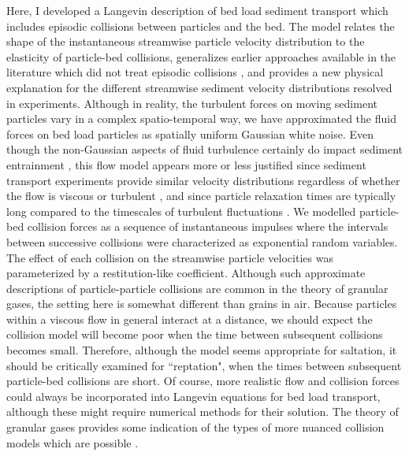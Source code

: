 Here, I developed a Langevin description of bed load sediment transport which includes episodic collisions between particles and the bed.
The model relates the shape of the instantaneous streamwise particle velocity distribution to the elasticity of particle-bed collisions,
generalizes earlier approaches available in the literature which did not treat episodic collisions \citep{Ancey2014,Fan2014}, and provides a new physical explanation for the different streamwise sediment velocity distributions resolved in experiments.
Although in reality, the turbulent forces on moving sediment particles vary in a complex spatio-temporal way, we have approximated the fluid forces on bed load particles as spatially uniform Gaussian white noise. Even though the non-Gaussian aspects of fluid turbulence certainly do impact sediment entrainment \citep{Cameron2020,Celik2014}, this flow model appears more or less justified since sediment transport experiments provide similar velocity distributions regardless of whether the flow is viscous or turbulent \citep{Lajeunesse2010, Charru2004}, and since particle relaxation times are typically long compared to the timescales of turbulent fluctuations \citep{Hofland2006,Schmeeckle2007,Nakagawa1981}.
We modelled particle-bed collision forces as a sequence of instantaneous impulses where the intervals between successive collisions were characterized as exponential random variables. The effect of each collision on the streamwise particle velocities was parameterized by a restitution-like coefficient.
Although such approximate descriptions of particle-particle collisions are common in the theory of granular gases, the setting here is somewhat different than grains in air. Because particles within a viscous flow in general interact at a distance, we should expect the collision model will become poor when the time between subsequent collisions becomes small. Therefore, although the model seems appropriate for saltation, it should be critically examined for ``reptation", when the times between subsequent particle-bed collisions are short. Of course, more realistic flow and collision forces could always be incorporated into Langevin equations for bed load transport, although these might require numerical methods for their solution. The theory of granular gases provides some indication of the types of more nuanced collision models which are possible \citep{Brilliantov2004}.

